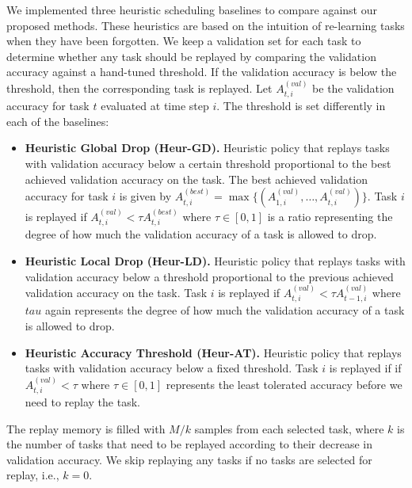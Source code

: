 We implemented three heuristic scheduling baselines to compare against our proposed methods. These heuristics are based on the intuition of re-learning tasks when they have been forgotten. We keep a validation set for each task to determine whether any task should be replayed by comparing the validation accuracy against a hand-tuned threshold. If the validation accuracy is below the threshold, then the corresponding task is replayed. Let $A_{t, i}^{(val)}$ be the validation accuracy for task $t$ evaluated at time step $i$. The threshold is set differently in each of the baselines:
\begin{itemize}[topsep=1pt,noitemsep]%
    \item {\bf Heuristic Global Drop (Heur-GD).} Heuristic policy that replays tasks  
    with validation accuracy below a certain threshold proportional to the best achieved validation accuracy on the task. The best achieved validation accuracy for task $i$ is given by $A_{t, i}^{(best)} = \max\{(A_{1, i}^{(val)}, \dots, A_{t, i}^{(val)})\}$. Task $i$ is replayed if $A_{t, i}^{(val)} < \tau A_{t, i}^{(best)}$ where $\tau \in [0, 1]$ is a ratio representing the degree of how much the validation accuracy of a task is allowed to drop. 

    \item {\bf Heuristic Local Drop (Heur-LD).} Heuristic policy that replays tasks with validation accuracy below a threshold proportional to the previous achieved validation accuracy on the task. Task $i$ is replayed if $A_{t, i}^{(val)} < \tau A_{t-1, i}^{(val)}$ where $tau$ again represents the degree of how much the validation accuracy of a task is allowed to drop. 

    \item {\bf Heuristic Accuracy Threshold (Heur-AT).} Heuristic policy that replays tasks with validation accuracy below a fixed threshold. Task $i$ is replayed if if $A_{t, i}^{(val)} < \tau$ where $\tau \in [0, 1]$ represents the least tolerated accuracy before we need to replay the task. 
\end{itemize}
The replay memory is filled with $M/k$ samples from each selected task, where $k$ is the number of tasks that need to be replayed according to their decrease in validation accuracy. We skip replaying any tasks if no tasks are selected for replay, i.e., $k=0$. 


